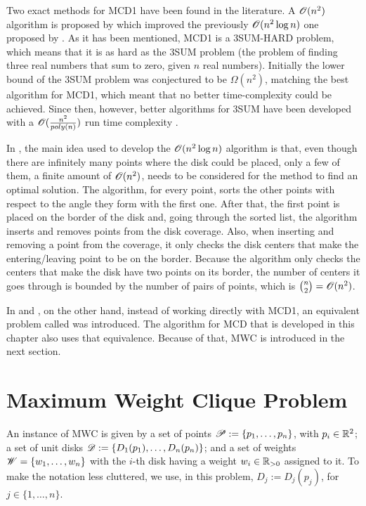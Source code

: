 Two exact methods for MCD1 have been found in the literature. A $\mathscr{O}(n^2)$ algorithm is proposed by  which improved the previously $\mathscr{O}(n^2\log{n})$ one proposed by .
As it has been mentioned, MCD1 is a 3SUM-HARD problem, which means that it is as hard as the 3SUM problem (the problem of finding three real numbers that sum to zero, given $n$ real numbers). Initially the lower bound of the 3SUM problem was conjectured to be $\Omega(n^2)$, matching the best algorithm for MCD1, which meant that no better time-complexity could be achieved. Since then, however, better algorithms for 3SUM have been developed with a $\mathscr{O}(\frac{n^2}{poly(n)})$ run time complexity \cite{3SUM-kopelowitz:2014}.


In , the main idea used to develop the $\mathscr{O}(n^2\log{n})$ algorithm is that, even though there are infinitely many points where the disk could be placed, only a few of them, a finite amount of $\mathscr{O}(n^2)$, needs to be considered for the method to find an optimal solution.
The algorithm, for every point, sorts the other points with respect to the angle they form with the first one. After that, the first point is placed on the border of the disk and, going through the sorted list, the algorithm inserts and removes points from the disk coverage. Also, when inserting and removing a point from the coverage, it only checks the disk centers that make the entering/leaving point to be on the border. Because the algorithm only checks the centers that make the disk have two points on its border, the number of centers it goes through is bounded by the number of pairs of points, which is $\binom{n}{2} = \mathscr{O}(n^2)$.

In  and , on the other hand, instead of working directly with MCD1, an equivalent problem called  was introduced. The algorithm for MCD that is developed in this chapter also uses that equivalence. Because of that, MWC is introduced in the next section.

\section{Maximum Weight Clique Problem}

An instance of MWC is given by a set of points $\mathscr{P}:=\{p_1,\dots,p_n\}$, with $p_i \in \mathbb{R}^2$; a set of unit disks $\mathscr{D}:=\{D_1(p_1),\dots,D_n(p_n)\}$; and a set of weights $\mathscr{W}=\{w_1, \dots, w_n\}$ with the $i$-th disk having a weight $w_i\in \mathbb{R}_{>0}$ assigned to it. To make the notation less cluttered, we use, in this problem, $D_j:=D_j(p_j)$, for $j\in\{1, \dots, n\}$.

